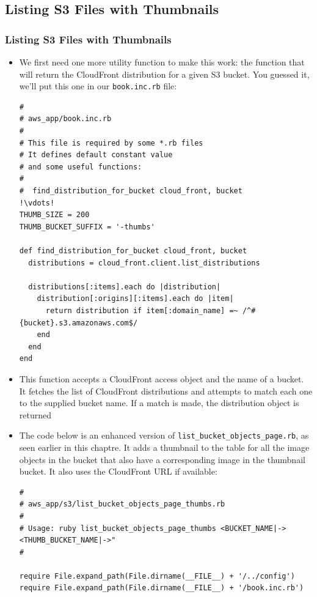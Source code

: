 \documentclass{beamer}
\begin{document}
\subsection{Listing S3 Files with Thumbnails}
\begin{frame}
\frametitle{Listing S3 Files with Thumbnails}
\begin{itemize}
\item We first need one more utility function
to make this work: the  function that will return the
CloudFront distribution for a given S3 bucket. You guessed it, we’ll put this one in
our \texttt{book.inc.rb} file:

\lstset{language=Ruby, style=eclipse}
\begin{lstlisting}[escapechar=!]
#
# aws_app/book.inc.rb
#
# This file is required by some *.rb files
# It defines default constant value
# and some useful functions:
#
#  find_distribution_for_bucket cloud_front, bucket
!\vdots!
THUMB_SIZE = 200
THUMB_BUCKET_SUFFIX = '-thumbs'

def find_distribution_for_bucket cloud_front, bucket
  distributions = cloud_front.client.list_distributions

  distributions[:items].each do |distribution|
    distribution[:origins][:items].each do |item|
      return distribution if item[:domain_name] =~ /^#{bucket}.s3.amazonaws.com$/
    end
  end
end
\end{lstlisting}

\item This function accepts a CloudFront access object and the name of a bucket. It fetches
the list of CloudFront distributions and attempts to match each one to the supplied
bucket name. If a match is made, the distribution object is returned

\item The code below is an enhanced version of \texttt{list\_bucket\_objects\_page.rb}, as seen
earlier in this chaptre. It adds a thumbnail to the table for all the image objects in
the bucket that also have a corresponding image in the thumbnail bucket. It also
uses the CloudFront URL if available:

\lstset{language=Ruby, style=eclipse}
\begin{lstlisting}[escapechar=!]
#
# aws_app/s3/list_bucket_objects_page_thumbs.rb
#
# Usage: ruby list_bucket_objects_page_thumbs <BUCKET_NAME|-> <THUMB_BUCKET_NAME|->"
#

require File.expand_path(File.dirname(__FILE__) + '/../config')
require File.expand_path(File.dirname(__FILE__) + '/book.inc.rb')


\end{lstlisting}
\end{itemize}
\end{frame}
\end{document}
